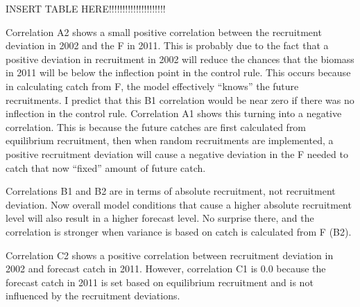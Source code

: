 INSERT TABLE HERE!!!!!!!!!!!!!!!!!!!!!

Correlation A2 shows a small positive correlation between the recruitment deviation in 2002 and the F in 2011.  This is probably due to the fact that a positive deviation in recruitment in 2002 will reduce the chances that the biomass in 2011 will be below the inflection point in the control rule.  This occurs because in calculating catch from F, the model effectively “knows” the future recruitments.  I predict that this B1 correlation would be near zero if there was no inflection in the control rule.
Correlation A1 shows this turning into a negative correlation.  This is because the future catches are first calculated from equilibrium recruitment, then when random recruitments are implemented, a positive recruitment deviation will cause a negative deviation in the F needed to catch that now “fixed” amount of future catch.

Correlations B1 and B2 are in terms of absolute recruitment, not recruitment deviation.  Now overall model conditions that cause a higher absolute recruitment level will also result in a higher forecast level.  No surprise there, and the correlation is stronger when variance is based on catch is calculated from F (B2).

Correlation C2 shows a positive correlation between recruitment deviation in 2002 and forecast catch in 2011.  However, correlation C1 is 0.0 because the forecast catch in 2011 is set based on equilibrium recruitment and is not influenced by the recruitment deviations.

